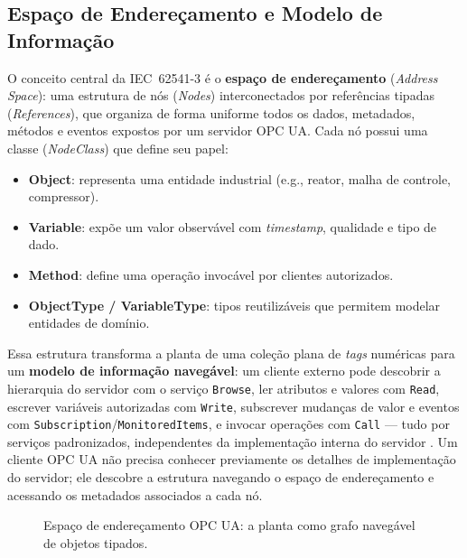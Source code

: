 \subsection{Espaço de Endereçamento e Modelo de Informação}

O conceito central da IEC~62541-3 \cite{IEC62541_3} é o \textbf{espaço de endereçamento} (\textit{Address Space}): uma estrutura de nós (\textit{Nodes}) interconectados por referências tipadas (\textit{References}), que organiza de forma uniforme todos os dados, metadados, métodos e eventos expostos por um servidor OPC UA. Cada nó possui uma classe (\textit{NodeClass}) que define seu papel:

\begin{itemize}
	\item \textbf{Object}: representa uma entidade industrial (e.g., reator, malha de controle, compressor).
	\item \textbf{Variable}: expõe um valor observável com \textit{timestamp}, qualidade e tipo de dado.
	\item \textbf{Method}: define uma operação invocável por clientes autorizados.
	\item \textbf{ObjectType / VariableType}: tipos reutilizáveis que permitem modelar entidades de domínio.
\end{itemize}

Essa estrutura transforma a planta de uma coleção plana de \textit{tags} numéricas para um \textbf{modelo de informação navegável}: um cliente externo pode descobrir a hierarquia do servidor com o serviço \texttt{Browse}, ler atributos e valores com \texttt{Read}, escrever variáveis autorizadas com \texttt{Write}, subscrever mudanças de valor e eventos com \texttt{Subscription}/\texttt{MonitoredItems}, e invocar operações com \texttt{Call} --- tudo por serviços padronizados, independentes da implementação interna do servidor \cite{Mahnke2009services}. Um cliente OPC UA não precisa conhecer previamente os detalhes de implementação do servidor; ele descobre a estrutura navegando o espaço de endereçamento e acessando os metadados associados a cada nó.

\begin{figure}[htbp]
	\centering
	\caption{Espaço de endereçamento OPC UA: a planta como grafo navegável de objetos tipados.}
	\label{fig:opcua_addressspace}
\end{figure}

